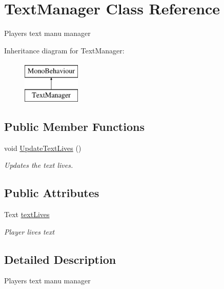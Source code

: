 \hypertarget{class_text_manager}{}\section{Text\+Manager Class Reference}
\label{class_text_manager}


Player\textquotesingle{}s text manu manager  


Inheritance diagram for Text\+Manager\+:\begin{figure}[H]
\begin{center}
\leavevmode
\includegraphics[height=2.000000cm]{class_text_manager}
\end{center}
\end{figure}
\subsection*{Public Member Functions}
\begin{DoxyCompactItemize}
\item 
void \mbox{\hyperlink{class_text_manager_a3bbadf652b27afb331e85866cc2b46d4}{Update\+Text\+Lives}} ()
\begin{DoxyCompactList}\small\item\em Updates the text lives. \end{DoxyCompactList}\end{DoxyCompactItemize}
\subsection*{Public Attributes}
\begin{DoxyCompactItemize}
\item 
Text \mbox{\hyperlink{class_text_manager_a8b12b74376f0b32cbef62f6b041e25f4}{text\+Lives}}
\begin{DoxyCompactList}\small\item\em Player lives text \end{DoxyCompactList}\end{DoxyCompactItemize}


\subsection{Detailed Description}
Player\textquotesingle{}s text manu manager 



